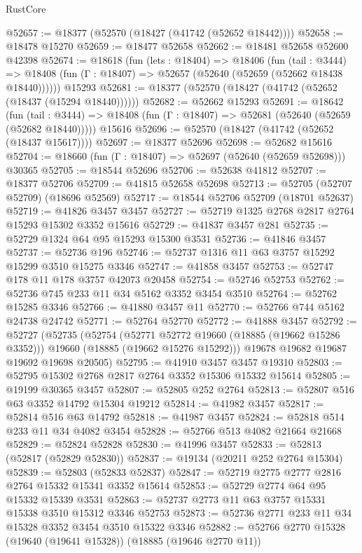 \begin{lexlean}{RustCore}
\begin{coremodule}
@52657 := @18377 (@52570 (@18427 (@41742 (@52652 @18442))))
@52658 := @18478 @15270
@52659 := @18477 @52658
@52662 := @18481 @52658 @52600 @42398
@52674 := @18618
    (fun (lets : @18404) =>
    @18406
      (fun (tail : @3444) =>
      @18408 (fun (Γ : @18407) => @52657 (@52640 (@52659 (@52662 @18438 @18440))))))
    @15293
@52681 := @18377 (@52570 (@18427 (@41742 (@52652 (@18437 (@15294 @18440))))))
@52682 := @52662 @15293
@52691 := @18642
    (fun (tail : @3444) => @18408 (fun (Γ : @18407) => @52681 (@52640 (@52659 (@52682 @18440)))))
    @15616
@52696 := @52570 (@18427 (@41742 (@52652 (@18437 @15617))))
@52697 := @18377 @52696
@52698 := @52682 @15616
@52704 := @18660 (fun (Γ : @18407) => @52697 (@52640 (@52659 @52698))) @30365
@52705 := @18544 @52696
@52706 := @52638 @41812
@52707 := @18377 @52706
@52709 := @41815 @52658 @52698
@52713 := @52705 (@52707 @52709) (@18696 @52569)
@52717 := @18544 @52706 @52709 (@18701 @52637)
@52719 := @41826 @3457 @3457
@52727 := @52719 @1325 @2768 @2817 @2764 @15293 @15302 @3352 @15616
@52729 := @41837 @3457 @281
@52735 := @52729 @1324 @64 @95 @15293 @15300 @3531
@52736 := @41846 @3457
@52737 := @52736 @196
@52746 := @52737 @1316 @11 @63 @3757 @15292 @15299 @3510 @15275 @3346
@52747 := @41858 @3457
@52753 := @52747 @178 @11 @178 @3757 @42073 @20458
@52754 := @52746 @52753
@52762 := @52736 @745 @233 @11 @34 @5162 @3352 @3454 @3510
@52764 := @52762 @15285 @3346
@52766 := @41880 @3457 @11
@52770 := @52766 @744 @5162 @24738 @24742
@52771 := @52764 @52770
@52772 := @41888 @3457
@52792 := @52727
    (@52735
      (@52754
        (@52771 @52772 @19660 (@18885 (@19662 @15286 @3352)))
        @19660
        (@18885 (@19662 @15276 @15292)))
      @19678
      @19682
      @19687
      @19692
      @19698
      @20505)
@52795 := @41910 @3457 @3457 @19310
@52803 := @52795 @15302 @2768 @2817 @2764 @3352 @15306 @15332 @15614
@52805 := @19199 @30365 @3457
@52807 := @52805 @252 @2764
@52813 := @52807 @516 @63 @3352 @14792 @15304 @19212
@52814 := @41982 @3457
@52817 := @52814 @516 @63 @14792
@52818 := @41987 @3457
@52824 := @52818 @514 @233 @11 @34 @4082 @3454
@52828 := @52766 @513 @4082 @21664 @21668
@52829 := @52824 @52828
@52830 := @41996 @3457
@52833 := @52813 (@52817 (@52829 @52830))
@52837 := @19134 (@20211 @252 @2764 @15304)
@52839 := @52803 (@52833 @52837)
@52847 := @52719 @2775 @2777 @2816 @2764 @15332 @15341 @3352 @15614
@52853 := @52729 @2774 @64 @95 @15332 @15339 @3531
@52863 := @52737 @2773 @11 @63 @3757 @15331 @15338 @3510 @15312 @3346 @52753
@52873 := @52736 @2771 @233 @11 @34 @15328 @3352 @3454 @3510 @15322 @3346
@52882 := @52766 @2770 @15328 (@19640 (@19641 @15328)) (@18885 (@19646 @2770 @11))

\end{coremodule}
\end{lexlean}
